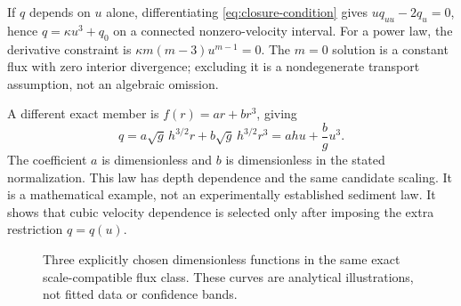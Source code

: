 \documentclass[11pt,a4paper,oneside]{report}
\numberwithin{equation}{chapter}
\begin{document}
If $q$ depends on $u$ alone, differentiating \eqref{eq:closure-condition} gives $uq_{uu}-2q_u=0$, hence $q=\kappa u^3+q_0$ on a connected nonzero-velocity interval. For a power law, the derivative constraint is $\kappa m(m-3)u^{m-1}=0$. The $m=0$ solution is a constant flux with zero interior divergence; excluding it is a nondegenerate transport assumption, not an algebraic omission.

A different exact member is $f(r)=ar+br^3$, giving
\begin{equation}\label{eq:example-family}
q=a\sqrt g\,h^{3/2}r+b\sqrt g\,h^{3/2}r^3
=ahu+\frac b g u^3.
\end{equation}
The coefficient $a$ is dimensionless and $b$ is dimensionless in the stated normalization. This law has depth dependence and the same candidate scaling. It is a mathematical example, not an experimentally established sediment law. It shows that cubic velocity dependence is selected only after imposing the extra restriction $q=q(u)$.

\begin{figure}[htbp]\centering
{}
\caption{Three explicitly chosen dimensionless functions in the same exact scale-compatible flux class. These curves are analytical illustrations, not fitted data or confidence bands.}\label{fig:closures}
\end{figure}
\end{document}
